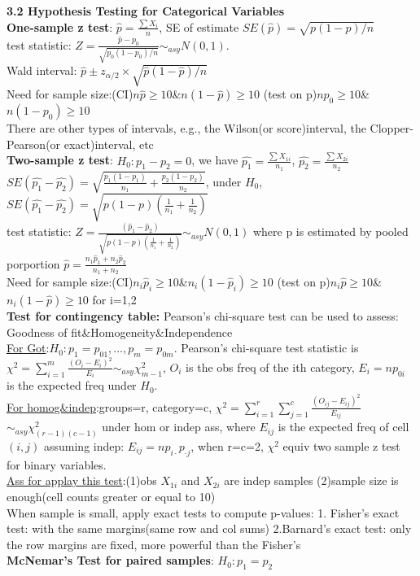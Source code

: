 \documentclass[10pt,a4paper,landscape]{article}
\begin{document}
\begin{multicols}{3}
{\textbf{3.2 Hypothesis Testing for Categorical Variables}\\
\textbf{One-sample z test}: $\hat{p}=\frac{\sum X_i}{n}$, SE of estimate $SE(\hat{p})=\sqrt{p(1-p)/n}$\\
test statistic: $Z=\frac{\hat{p}-p_0}{\sqrt{p_0(1-p_0)/n}} \sim_{asy} N(0,1)$.\\
Wald interval: $\hat{p}\pm z_{\alpha/2}\times \sqrt{\hat{p}(1-\hat{p})/n}$\\
Need for sample size:(CI)$n\hat{p}\geq 10$\&$n(1-\hat{p})\geq 10$ (test on p)$np_0\geq 10$\& $n(1-p_0)\geq10$ \\ 
 There are other types of intervals, e.g., the Wilson(or score)interval, the Clopper-Pearson(or exact)interval, etc\\
\textbf{Two-sample z test}: $H_0:p_1-p_2=0$, we have $\hat{p_1}=\frac{\sum X_{1i}}{n_1}$, $\hat{p_2}=\frac{\sum X_{2i}}{n_2}$\\
$SE(\hat{p_1}-\hat{p_2})=\sqrt{\frac{p_1(1-p_1)}{n_1}+\frac{p_2(1-p_2)}{n_2}}$, under $H_0$, $SE(\hat{p_1}-\hat{p_2})=\sqrt{p(1-p)(\frac{1}{n_1}+\frac{1}{n_2})}$\\
test statistic: $Z=\frac{(\hat{p}_1-\hat{p}_2)}{\sqrt{p(1-p)(\frac{1}{n_1}+\frac{1}{n_2})}}\sim _{asy} N(0,1)$ where p is estimated by pooled porportion $\hat{p}=\frac{n_1\hat{p}_1+n_2\hat{p}_2}{n_1+n_2}$\\
Need for sample size:(CI)$n_i\hat{p}_i\geq 10$\&$n_i(1-\hat{p}_i)\geq 10$ (test on p)$n_i \hat{p}\geq 10$\& $n_i(1-\hat{p})\geq10$ for i=1,2\\ 
\textbf{Test for contingency table: } Pearson's chi-square test  can be used to assess: Goodness of fit\&Homogeneity\&Independence\\
\underline{For Got}:$H_0: p_1=p_{01},...,p_m=p_{0m}$.
Pearson's chi-square test statistic is $\chi^2=\sum_{i=1}^m \frac{(O_i-E_i)^2}{E_i}\sim_{asy} \chi^2_{m-1} $, $O_i$ is the obs freq of the ith category, $E_i=np_{0i}$ is the expected freq under $H_0$.\\
\underline{For homog\&indep}:groups=r, category=c, $\chi^2=\sum_{i=1}^{r}\sum_{j=1}^{c}\frac{(O_{ij}-E_{ij})^2}{E_{ij}}$ $\sim_{asy} \chi^2_{(r-1)(c-1)}$ under hom or indep ass, where $E_{ij}$ is the expected freq of cell $(i,j)$ assuming indep: $E_{ij}=np_{i\cdot}p_{\cdot j}$, when r=c=2, $\chi^2$ equiv two sample z test for binary variables. \\
\underline{Ass for applay this test}:(1)obs $X_{1i}$ and $X_{2i}$ are indep samples (2)sample size is enough(cell counts greater or equal to 10)\\
When sample is small, apply exact tests to compute p-values: 1. Fisher's exact test: with the same margins(same row and col sums) 2.Barnard's exact test: only the row margins are fixed, more powerful than the Fisher's\\
\textbf{McNemar's Test for paired samples}: $H_0:p_1=p_2$

}
\end{multicols}
\end{document}
